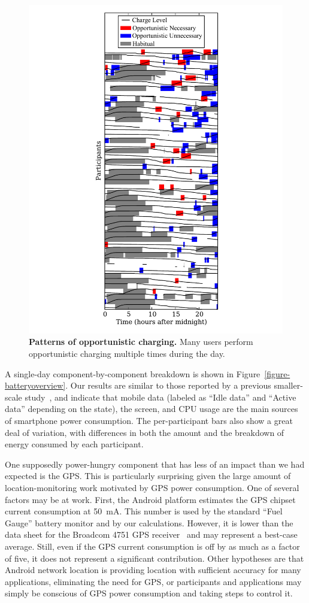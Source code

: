 \begin{figure}[t]
\centering
\includegraphics[width=0.6\columnwidth]{./figures/power/opportunistic_charging/count_and_by_time/graph.pdf}
\caption{\textbf{Patterns of opportunistic charging.} Many users perform
opportunistic charging multiple times during the day.}
\label{fig-opportunistic-patterns}
\end{figure}

A single-day component-by-component breakdown is shown in
Figure~\ref{figure-batteryoverview}. Our results are similar to those reported
by a previous smaller-scale study~\cite{shye:micro:2009}, and indicate that
mobile data (labeled as ``Idle data'' and ``Active data'' depending on the
state), the screen, and CPU usage are the main sources of smartphone power
consumption. The per-participant bars also show a great deal of variation, with
differences in both the amount and the breakdown of energy consumed by each
participant.

One supposedly power-hungry component that has less of an impact than we had
expected is the GPS. This is particularly surprising given the large amount
of location-monitoring work motivated by GPS power consumption. One of
several factors may be at work. First, the Android platform estimates the GPS
chipset current consumption at 50~mA. This number is used by the standard
``Fuel Gauge'' battery monitor and by our calculations. However, it is lower
than the data sheet for the Broadcom 4751 GPS receiver~\cite{bcm4751} and may
represent a best-case average. Still, even if the GPS current consumption is
off by as much as a factor of five, it does not represent a significant
contribution. Other hypotheses are that Android network location is providing
location with sufficient accuracy for many applications, eliminating the need
for GPS, or participants and applications may simply be conscious of GPS
power consumption and taking steps to control it.

